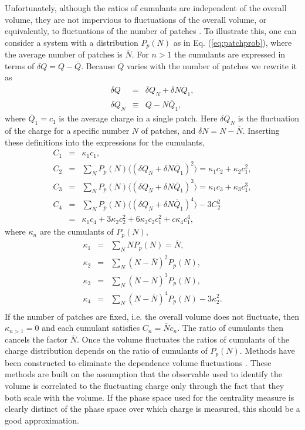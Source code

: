 Unfortunately, although the ratios of cumulants are independent of the overall volume, they are not impervious to fluctuations of the overall volume, or equivalently, to fluctuations of the number of patches \cite{volumefluc}. To illustrate this, one can consider a system with a distribution $P_p(N)$  as in Eq. (\ref{eq:patchprob}), where the average number of patches is $\overline{N}$. For $n>1$ the cumulants are expressed in terms of $\delta Q=Q-\overline{Q}$. Because $\overline{Q}$ varies with the number of patches we rewrite it as
\begin{eqnarray}
\delta Q&=&\delta Q_N+\delta N\overline{Q}_1,\\
\delta Q_N&\equiv&Q-N\overline{Q}_1,
\end{eqnarray}
where $\overline{Q}_1=c_1$ is the average charge in a single patch. Here $\delta Q_N$ is the fluctuation of the charge for a specific number $N$ of patches, and $\delta N=N-\overline{N}$. Inserting these definitions into the expressions for the cumulants,
\begin{eqnarray}\label{eq:volfluc}
C_1&=&\kappa_1c_1,\\
\nonumber
C_2&=&\sum_NP_p(N) \langle(\delta Q_N+\delta N\overline{Q}_1)^2\rangle=\kappa_1c_2+\kappa_2c_1^2,\\
\nonumber
C_3&=&\sum_NP_p(N) \langle(\delta Q_N+\delta N\overline{Q}_1)^3\rangle=\kappa_1c_3+\kappa_3c_1^3,\\
\nonumber
C_4&=&\sum_NP_p(N) \langle(\delta Q_N+\delta N\overline{Q}_1)^4\rangle-3C_2^2\\
\nonumber
&=&\kappa_1c_4+3\kappa_2c_2^2+6\kappa_3c_2c_1^2+c\kappa_4c_1^4,
\end{eqnarray}
where $\kappa_n$ are the cumulants of $P_p(N)$,
\begin{eqnarray}\label{eq:kappadef}
\kappa_1&=&\sum_N NP_p(N)=\overline{N},\\
\nonumber
\kappa_2&=&\sum_N (N-\overline{N})^2P_p(N),\\
\nonumber
\kappa_3&=&\sum_N (N-\overline{N})^3P_p(N),\\
\nonumber
\kappa_4&=&\sum_N (N-\overline{N})^4P_p(N)-3\kappa_2^2.\\
\end{eqnarray}
If the number of patches are fixed, i.e. the overall volume does not fluctuate, then $\kappa_{n>1}=0$ and each cumulant satisfies $C_n=\overline{N} c_n$. The ratio of cumulants then cancels the factor $\overline{N}$. 
Once the volume fluctuates the ratios of cumulants of the charge distribution depends on the ratio of cumulants of $P_p(N)$. Methods have been constructed to eliminate the dependence volume fluctuations \cite{Begun:2014boa,Gazdzicki:2013ana,Gorenstein:2011vq,Sangaline:2015bma}. These methods are built on the assumption that the observable used to identify the volume is correlated to the fluctuating charge only through the fact that they both scale with the volume. If the phase space used for the centrality measure is clearly distinct of the phase space over which charge is measured, this should be a good approximation. 

